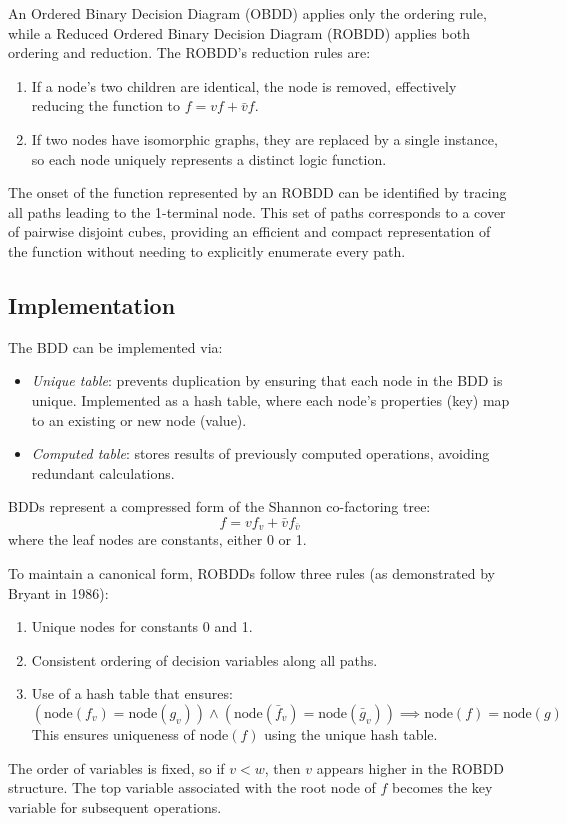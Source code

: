 An Ordered Binary Decision Diagram (OBDD) applies only the ordering rule, while a Reduced Ordered Binary Decision Diagram (ROBDD) applies both ordering and reduction. 
The ROBDD's reduction rules are:
\begin{enumerate}
    \item If a node's two children are identical, the node is removed, effectively reducing the function to $f = vf + \bar{v}f$. 
    \item If two nodes have isomorphic graphs, they are replaced by a single instance, so each node uniquely represents a distinct logic function.
\end{enumerate} 
The onset of the function represented by an ROBDD can be identified by tracing all paths leading to the 1-terminal node. 
This set of paths corresponds to a cover of pairwise disjoint cubes, providing an efficient and compact representation of the function without needing to explicitly enumerate every path.

\subsection{Implementation}
The BDD can be implemented via: 
\begin{itemize}
    \item \textit{Unique table}: prevents duplication by ensuring that each node in the BDD is unique.
        Implemented as a hash table, where each node's properties (key) map to an existing or new node (value).
    \item \textit{Computed table}: stores results of previously computed operations, avoiding redundant calculations.
\end{itemize}
BDDs represent a compressed form of the Shannon co-factoring tree:
\[f=vf_v+\bar{v}f_{\bar{v}}\]
where the leaf nodes are constants, either 0 or 1.

To maintain a canonical form, ROBDDs follow three rules (as demonstrated by Bryant in 1986):
\begin{enumerate}
    \item Unique nodes for constants 0 and 1.
    \item Consistent ordering of decision variables along all paths.
    \item Use of a hash table that ensures:
        \[(\text{node}(f_v) = \text{node}(g_v)) \land (\text{node}(\bar{f}_v) = \text{node}(\bar{g}_v)) \implies \text{node}(f) = \text{node}(g)\]
        This ensures uniqueness of $\text{node}(f)$ using the unique hash table.
\end{enumerate}
The order of variables is fixed, so if $v < w$, then $v$ appears higher in the ROBDD structure.
The top variable associated with the root node of $f$ becomes the key variable for subsequent operations.


